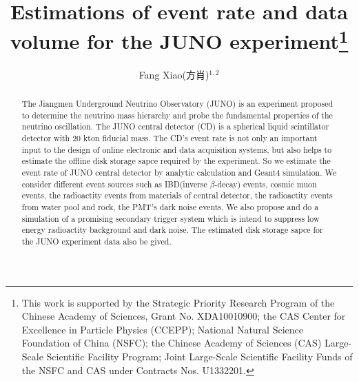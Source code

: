 \documentclass[a4paper,10pt,twoside]{paper}
\begin{document}

	\title{Estimations of event rate and data volume for the JUNO experiment\thanks{This work is supported by the Strategic Priority Research Program of the Chinese Academy of Sciences, Grant No. XDA10010900; the CAS Center for Excellence in Particle Physics (CCEPP); National Natural Science Foundation of China (NSFC); the Chinese Academy of Sciences (CAS) Large-Scale Scientific Facility Program; Joint Large-Scale Scientific Facility Funds of the NSFC and CAS under Contracts Nos. U1332201.} }


	\author{Fang Xiao(方肖)$^{1,2}$
	}
	\maketitle

	\address{
		$^1$ School of Physics, Sichuan University, Chengdu 610065 , China\\
		$^2$ Institute of High Energy Physics, Chinese Academy of Sciences, Beijing 100049, China\\
	}

	\begin{abstract}
		The Jiangmen Underground Neutrino Observatory (JUNO) is an experiment proposed to determine
		the neutrino mass hierarchy and probe the fundamental properties of the neutrino oscillation. 
		The JUNO central detector (CD) is a spherical liquid scintillator detector with 20 kton fiducial mass. 
		The CD's event rate is not only an important input to the design of online 
		electronic and data acquisition
		systems, but also helps to estimate the offline disk storage sapce required by the experiment.
		So we estimate the event rate of JUNO central detector by analytic calculation and Geant4 simulation. 
		We consider different event sources such
		as IBD(inverse $\beta$-decay) events, cosmic muon events, the radioactity events from materials of
		central detector, the radioactity events from water pool and rock, the PMT's dark noise events.
		We also propose and do a simulation of a promising secondary trigger system which is intend to
		suppress low energy 
		radioactity background and dark noise. The estimated disk storage sapce for the JUNO experiment data
		also be gived.

	\end{abstract}
\end{document}
